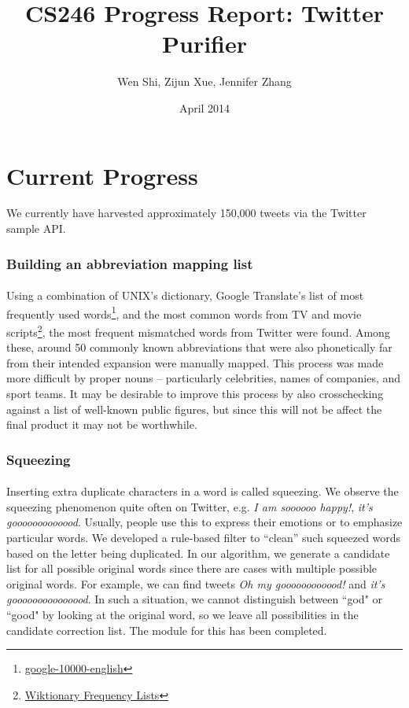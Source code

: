 \documentclass{article}
\title{CS246 Progress Report: Twitter Purifier}
\author{Wen Shi, Zijun Xue, Jennifer Zhang}
\date{April 2014}
\begin{document}
\maketitle


\section*{Current Progress}
We currently have harvested approximately 150,000 tweets via the Twitter sample API.
\subsubsection*{Building an abbreviation mapping list}
\paragraph{} Using a combination of UNIX's dictionary, Google Translate's list of most frequently used words\footnote{\href{https://github.com/first20hours/google-10000-english}{google-10000-english}}, and the most common words from TV and movie scripts\footnote{\href{http://en.wiktionary.org/wiki/Wiktionary:Frequency_lists\#TV_and_movie_scripts}{Wiktionary Frequency Lists}}, the most frequent mismatched words from Twitter were found. Among these, around 50 commonly known abbreviations that were also phonetically far from their intended expansion were manually mapped. This process was made more difficult by proper nouns -- particularly celebrities, names of companies, and sport teams. It may be desirable to improve this process by also crosschecking against a list of well-known public figures, but since this will not be affect the final product it may not be worthwhile.
\subsubsection*{Squeezing}
\paragraph{} Inserting extra duplicate characters in a word is called squeezing.
We observe the squeezing phenomenon quite often on Twitter, e.g. \textit{I am soooooo happy!}, \textit{it's gooooooooooood}. Usually, people use this to express their emotions or to emphasize particular words. We developed a rule-based filter to ``clean'' such squeezed words based on the letter being duplicated. In our algorithm, we generate a candidate list for all possible original words since there are cases with multiple possible original words. For example, we can find tweets \textit{Oh my goooooooooood!} and \textit{it's gooooooooooooood}. In such a situation, we cannot distinguish between ``god" or ``good" by looking at the original word, so we leave all possibilities in the candidate correction list. The module for this has been completed.
\end{document}

